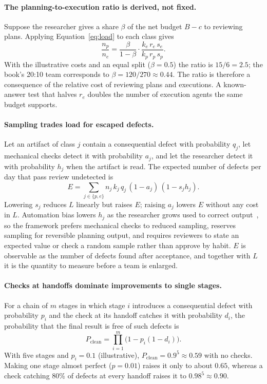 \paragraph{The planning-to-execution ratio is derived, not fixed.} Suppose the researcher
gives a share $\beta$ of the net budget $B-c$ to reviewing plans. Applying
Equation~\eqref{eq:load} to each class gives
\begin{equation}
  \frac{n_p}{n_e} = \frac{\beta}{1-\beta}\cdot\frac{k_e\, r_e\, s_e}{k_p\, r_p\, s_p}.
  \label{eq:ratio}
\end{equation}
With the illustrative costs and an equal split ($\beta=0.5$) the ratio is $15/6=2.5$; the
book's 20:10 team corresponds to $\beta=120/270\approx0.44$. The ratio is therefore a
consequence of the relative cost of reviewing plans and executions. A known-answer test
that halves $r_e$ doubles the number of execution agents the same budget supports.

\paragraph{Sampling trades load for escaped defects.} Let an artifact of class $j$
contain a consequential defect with probability $q_j$, let mechanical checks detect it
with probability $a_j$, and let the researcher detect it with probability $h_j$ when the
artifact is read. The expected number of defects per day that pass review undetected is
\begin{equation}
  E = \sum_{j\in\{p,e\}} n_j\, k_j\, q_j\,(1-a_j)\,(1-s_j h_j).
  \label{eq:escape}
\end{equation}
Lowering $s_j$ reduces $L$ linearly but raises $E$; raising $a_j$ lowers $E$ without any
cost in $L$. Automation bias lowers $h_j$ as the researcher grows used to correct
output~\cite{parasuraman2010complacency}, so the framework prefers mechanical checks to
reduced sampling, reserves sampling for reversible planning output, and requires
reviewers to state an expected value or check a random sample rather than approve by
habit. $E$ is observable as the number of defects found after acceptance, and together
with $L$ it is the quantity to measure before a team is enlarged.

\paragraph{Checks at handoffs dominate improvements to single stages.} For a chain of $m$
stages in which stage $i$ introduces a consequential defect with probability $p_i$ and
the check at its handoff catches it with probability $d_i$, the probability that the
final result is free of such defects is
\begin{equation}
  P_{\mathrm{clean}} = \prod_{i=1}^{m}\bigl(1 - p_i(1-d_i)\bigr).
  \label{eq:pipeline}
\end{equation}
With five stages and $p_i=0.1$ (illustrative), $P_{\mathrm{clean}}=0.9^5\approx0.59$ with
no checks. Making one stage almost perfect ($p=0.01$) raises it only to about $0.65$,
whereas a check catching 80\% of defects at every handoff raises it to
$0.98^5\approx0.90$.

